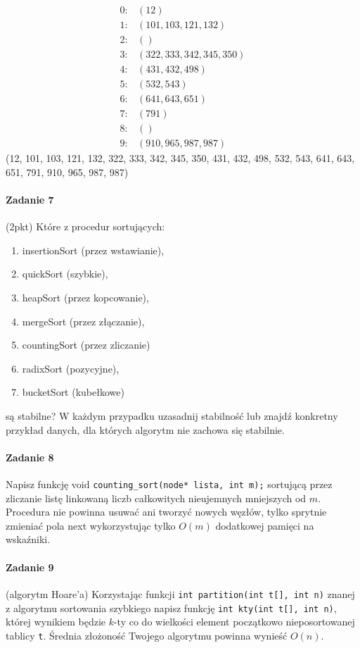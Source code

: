 \documentclass[18pt]{extarticle}
\begin{document}
\begin{align*}
    0: & \left(12\right) \\
    1: & \left(101, 103, 121, 132\right) \\
    2: & \left(\right) \\
    3: & \left(322, 333, 342, 345, 350\right) \\
    4: & \left(431, 432, 498\right) \\
    5: & \left(532, 543\right) \\
    6: & \left(641, 643, 651\right) \\
    7: & \left(791\right) \\
    8: & \left(\right) \\
    9: & \left(910, 965, 987, 987\right)
\end{align*}
(12, 101, 103, 121, 132, 322, 333, 342, 345, 350, 431, 432, 498, 532, 543, 641, 643, 651, 791, 910, 965, 987, 987)

\paragraph{Zadanie 7} (2pkt) Które z procedur sortujących:
\begin{enumerate}
    \item insertionSort (przez wstawianie),
    \item quickSort (szybkie),
    \item heapSort (przez kopcowanie),
    \item mergeSort (przez złączanie),
    \item countingSort (przez zliczanie)
    \item radixSort (pozycyjne),
    \item bucketSort (kubełkowe)
\end{enumerate}
są stabilne? W każdym przypadku uzasadnij stabilność lub znajdź konkretny przykład danych, dla których algorytm nie zachowa się stabilnie.

\paragraph{Zadanie 8} Napisz funkcję void \verb+counting_sort(node* lista, int m);+ sortującą przez zliczanie listę linkowaną liczb całkowitych nieujemnych mniejszych od $m$. Procedura nie powinna usuwać ani tworzyć nowych węzłów, tylko sprytnie zmieniać pola next wykorzystując tylko $O(m)$ dodatkowej pamięci na wskaźniki.

\paragraph{Zadanie 9} (algorytm Hoare'a) Korzystając funkcji \verb+int partition(int t[], int n)+ znanej z algorytmu sortowania szybkiego napisz funkcję \verb+int kty(int t[], int n)+, której wynikiem będzie $k$-ty co do wielkości element początkowo nieposortowanej tablicy \verb+t+. Średnia złożoność Twojego algorytmu powinna wynieść $O(n)$.
\end{document}

